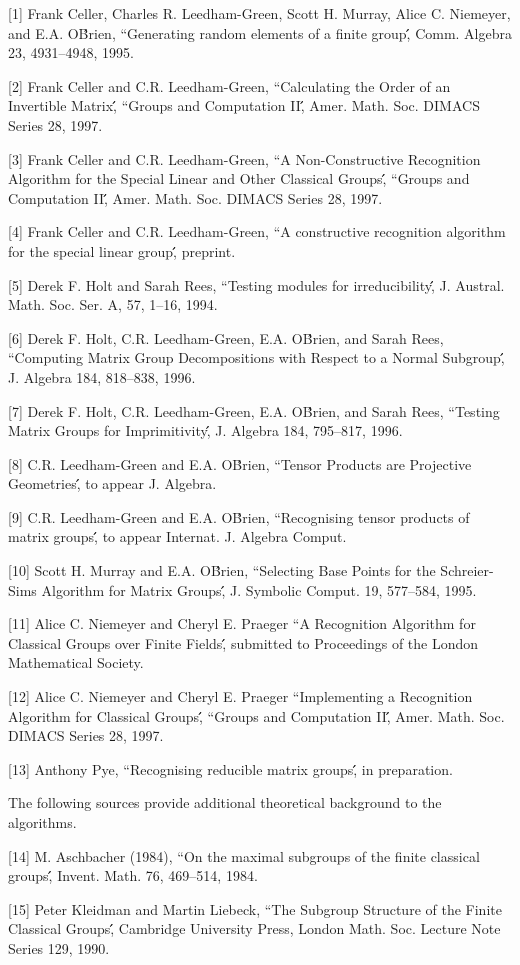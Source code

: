 
[1]
  Frank Celler,  Charles  R. Leedham-Green, Scott H. Murray,  Alice
  C.  Niemeyer,  and E.A.  O\'Brien, ``Generating  random elements of a
  finite group\'\', Comm. Algebra 23, 4931--4948, 1995.

[2]
  Frank Celler  and C.R.   Leedham-Green, ``Calculating the  Order of an
  Invertible Matrix\'\', ``Groups and Computation II\'\', 
  Amer. Math. Soc. DIMACS Series 28, 1997.

[3]
  Frank Celler and C.R. Leedham-Green, ``A Non-Constructive Recognition
  Algorithm  for the  Special  Linear and  Other Classical Groups\'\', 
  ``Groups and Computation II\'\', Amer. Math. Soc. DIMACS Series 28, 1997.

[4]
  Frank  Celler and C.R.  Leedham-Green,   ``A constructive recognition
  algorithm for the special linear group\'\', preprint.

[5]
  Derek F. Holt and Sarah Rees,  ``Testing modules for irreducibility\'\', 
  J. Austral. Math. Soc. Ser. A, 57, 1--16, 1994.

[6] 
  Derek F. Holt, C.R. Leedham-Green, E.A. O\'Brien, and Sarah Rees, 
  ``Computing Matrix Group Decompositions with Respect to a Normal Subgroup\'\', 
  J. Algebra 184, 818--838, 1996.

[7]
  Derek F. Holt, C.R. Leedham-Green, E.A. O\'Brien, and Sarah Rees, 
  ``Testing Matrix Groups for Imprimitivity\'\', 
  J. Algebra 184, 795--817, 1996.

[8] C.R. Leedham-Green and E.A. O\'Brien,
  ``Tensor Products are Projective Geometries\'\',
   to appear J. Algebra.

[9] C.R. Leedham-Green and E.A. O\'Brien,
  ``Recognising tensor products of matrix groups\'\',
  to appear Internat. J. Algebra Comput.

[10] Scott H. Murray and E.A. O\'Brien,
  ``Selecting Base Points for the Schreier-Sims Algorithm for Matrix Groups\'\',
  J. Symbolic Comput. 19, 577--584, 1995.

[11] Alice C. Niemeyer and  Cheryl E. Praeger 
  ``A Recognition Algorithm for Classical Groups over Finite Fields\'\',
  submitted to Proceedings of the London Mathematical Society.

[12] Alice C. Niemeyer and  Cheryl E. Praeger 
  ``Implementing a Recognition Algorithm for Classical Groups\'\',
  ``Groups and Computation II\'\', Amer. Math. Soc. DIMACS Series 28, 1997.

[13] Anthony Pye, ``Recognising reducible matrix groups\'\', 
  in preparation.

The following sources provide additional theoretical background
to the algorithms.

[14]
  M. Aschbacher (1984),  ``On the maximal subgroups of the finite classical
  groups\'\',  Invent. Math. 76, 469--514, 1984.

[15]
  Peter  Kleidman and  Martin Liebeck, ``The   Subgroup Structure of  the
  Finite  Classical   Groups\'\',   Cambridge   University Press,  London
  Math. Soc. Lecture Note Series 129, 1990.



